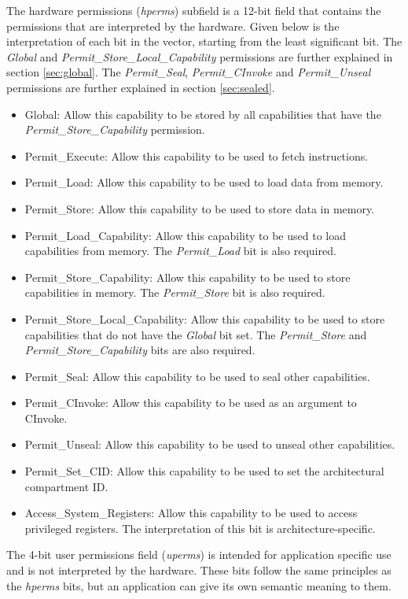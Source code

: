 The hardware permissions (\textit{hperms}) subfield is a 12-bit field that contains the permissions that are interpreted by the hardware. Given below is the interpretation of each bit in the vector, starting from the least significant bit. The \textit{Global} and \textit{Permit\_Store\_Local\_Capability} permissions are further explained in section \ref{sec:global}. The \textit{Permit\_Seal}, \textit{Permit\_CInvoke} and \textit{Permit\_Unseal} permissions are further explained in section \ref{sec:sealed}.
\begin{itemize}
    \item Global: Allow this capability to be stored by all capabilities that have the \textit{Permit\_Store\_Capability} permission.
    \item Permit\_Execute: Allow this capability to be used to fetch instructions.
    \item Permit\_Load: Allow this capability to be used to load data from memory.
    \item Permit\_Store: Allow this capability to be used to store data in memory.
    \item Permit\_Load\_Capability: Allow this capability to be used to load capabilities from memory. The \textit{Permit\_Load} bit is also required.
    \item Permit\_Store\_Capability: Allow this capability to be used to store capabilities in memory. The \textit{Permit\_Store} bit is also required.
    \item Permit\_Store\_Local\_Capability: Allow this capability to be used to store capabilities that do not have the \textit{Global} bit set. The \textit{Permit\_Store} and \textit{Permit\_Store\_Capability} bits are also required.
    \item Permit\_Seal: Allow this capability to be used to seal other capabilities.
    \item Permit\_CInvoke: Allow this capability to be used as an argument to CInvoke.
    \item Permit\_Unseal: Allow this capability to be used to unseal other capabilities.
    \item Permit\_Set\_CID: Allow this capability to be used to set the architectural compartment ID.
    \item Access\_System\_Registers: Allow this capability to be used to access privileged registers. The interpretation of this bit is architecture-specific.
\end{itemize}
The 4-bit user permissions field (\textit{uperms}) is intended for application specific use and is not interpreted by the hardware. These bits follow the same principles as the \textit{hperms} bits, but an application can give its own semantic meaning to them.

